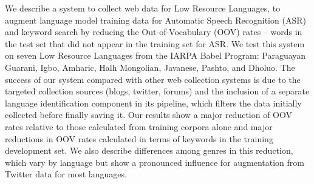 We describe a system to collect web data for Low Resource Languages, to augment language model training data for Automatic Speech Recognition (ASR) and keyword search by reducing the Out-of-Vocabulary (OOV) rates -- words in the test set that did not appear in the training set for ASR.   We test this system on seven Low Resource Languages from the IARPA Babel Program:  Paraguayan Guarani, Igbo, Amharic, Halh Mongolian, Javanese, Pashto, and Dholuo.              The success of our system compared with other web collection systems is due to the targeted collection sources (blogs, twitter, forums) and the  inclusion of a separate language identification component in its pipeline, which filters the data initially collected before finally saving it.  Our results show a major reduction of OOV rates relative to those calculated from training corpora alone and major reductions in OOV rates calculated in terms of keywords in the training development set.  We also describe differences among genres in this reduction, which vary by language but show a pronounced influence for augmentation from Twitter data for most languages.
